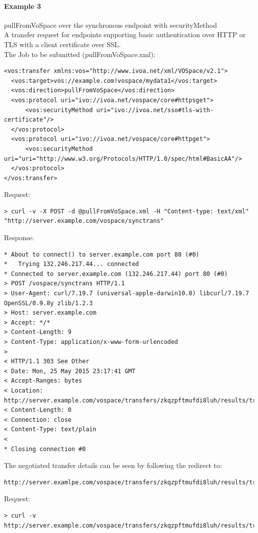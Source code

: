 \documentclass[11pt,a4paper]{ivoa}
\begin{document}
\paragraph{Example 3}
pullFromVoSpace over the synchronous endpoint with securityMethod
\\[5px]
\noindent
A transfer request for endpoints supporting basic authentication over HTTP or TLS with a client certificate over SSL.\\
The Job to be submitted (pullFromVoSpace.xml):
\begin{lstlisting}
<vos:transfer xmlns:vos="http://www.ivoa.net/xml/VOSpace/v2.1">
  <vos:target>vos://example.com!vospace/mydata1</vos:target>
  <vos:direction>pullFromVoSpace</vos:direction>
  <vos:protocol uri="ivo://ivoa.net/vospace/core#httpsget">
      <vos:securityMethod uri="ivo://ivoa.net/sso#tls-with-certificate"/>
  </vos:protocol>
  <vos:protocol uri="ivo://ivoa.net/vospace/core#httpget">
      <vos:securityMethod uri="uri="http://www.w3.org/Protocols/HTTP/1.0/spec/html#BasicAA"/>
  </vos:protocol>
</vos:transfer>
\end{lstlisting}
Request:
\begin{lstlisting}
> curl -v -X POST -d @pullFromVoSpace.xml -H "Content-type: text/xml" "http://server.example.com/vospace/synctrans"
\end{lstlisting}
Response:
\begin{lstlisting}
* About to connect() to server.example.com port 80 (#0)
*   Trying 132.246.217.44... connected
* Connected to server.example.com (132.246.217.44) port 80 (#0)
> POST /vospace/synctrans HTTP/1.1
> User-Agent: curl/7.19.7 (universal-apple-darwin10.0) libcurl/7.19.7 OpenSSL/0.9.8y zlib/1.2.3
> Host: server.example.com
> Accept: */*
> Content-Length: 9
> Content-Type: application/x-www-form-urlencoded
>
< HTTP/1.1 303 See Other
< Date: Mon, 25 May 2015 23:17:41 GMT
< Accept-Ranges: bytes
< Location: http://server.example.com/vospace/transfers/zkqzpftmufdi8luh/results/transferDetails
< Content-Length: 0
< Connection: close
< Content-Type: text/plain
<
* Closing connection #0
\end{lstlisting}
The negotiated transfer details can be seen by following the redirect to:
\begin{lstlisting}
http://server.examlpe.com/vospace/transfers/zkqzpftmufdi8luh/results/transferDetails
\end{lstlisting}
Request:
\begin{lstlisting}
> curl -v http://server.example.com/vospace/transfers/zkqzpftmufdi8luh/results/transferDetails
\end{lstlisting}
\end{document}
